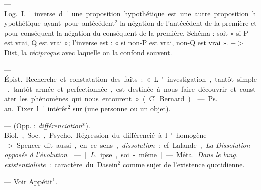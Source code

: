 \begin{itemize}[leftmargin=1cm, label=, itemsep=1pt]
 — \si{Log.} L'inverse d'une proposition hypothétique est une
autre proposition hypothétique ayant pour antécédent$^2$ la négation de
l’antécédent de la première et pour conséquent la négation du conséquent de
la première. Schéma : soit « si P est vrai, Q est vrai »; l'inverse est :
« si non-P est vrai, non-Q est vrai ». $->$ Dist, la {\it réciproque} avec
laquelle on la confond souvent.

 — \si{Épist.} Recherche et constatation des faits :
« L'investigation, tantôt simple, tantôt armée et perfectionnée, est destinée
à nous faire découvrir et constater les phénomènes qui nous entourent » (Cl.
Bernard).

 — \si{Ps. an.} Fixer l'intérêt$^2$ sur (une personne ou un
objet).

 — (Opp. : {\it différenciation}*). \si{Biol.}, \si{Soc.},
\si{Psycho.} Régression du différencié à l’homogène. -> Spencer dit aussi, en
ce sens, {\it dissolution} : cf. Lalande, {\it La Dissolution opposée à
l’évolution}.

 — [{\it L.} ipse, soi-même] — \si{Méta.} {\it Dans le lang.
existentialiste} : caractère du Dasein$^2$ comme sujet de l’existence
quotidienne.

 — Voir Appétit$^1$.



	\end{itemize}
